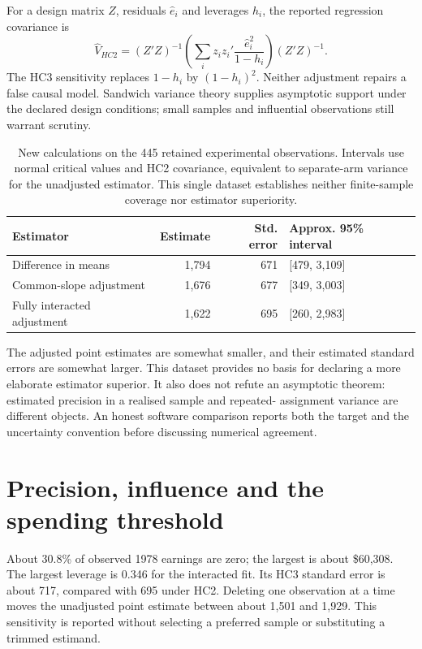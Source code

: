 For a design matrix $Z$, residuals $\widehat e_i$ and leverages $h_i$, the
reported regression covariance is
\[
 \widehat V_{HC2}=(Z'Z)^{-1}
 \left(\sum_i z_i z_i'\frac{\widehat e_i^2}{1-h_i}\right)(Z'Z)^{-1}.
\]
The HC3 sensitivity replaces $1-h_i$ by $(1-h_i)^2$. Neither adjustment
repairs a false causal model. Sandwich variance theory supplies asymptotic
support under the declared design conditions; small samples and influential
observations still warrant scrutiny. \citep{gap29lin}




\begin{table}[htbp]
\centering\small
\begin{tabular}{lrrl}
\toprule
Estimator & Estimate & Std. error & Approx. 95\% interval \\
\midrule
Difference in means & 1,794 & 671 & [479, 3,109] \\
Common-slope adjustment & 1,676 & 677 & [349, 3,003] \\
Fully interacted adjustment & 1,622 & 695 & [260, 2,983] \\
\bottomrule
\end{tabular}
\caption{New calculations on the 445 retained experimental observations.
Intervals use normal critical values and HC2 covariance, equivalent to
separate-arm variance for the unadjusted estimator. This single dataset
establishes neither finite-sample coverage nor estimator superiority.}
\end{table}




The adjusted point estimates are somewhat smaller, and their estimated
standard errors are somewhat larger. This dataset provides no basis for
declaring a more elaborate estimator superior. It also does not refute an
asymptotic theorem: estimated precision in a realised sample and repeated-
assignment variance are different objects. An honest software comparison
reports both the target and the uncertainty convention before discussing
numerical agreement.

\section{Precision, influence and the spending threshold}
About 30.8\% of observed 1978 earnings are zero; the largest is about
\$60,308. The largest leverage is 0.346 for the interacted fit. Its HC3
standard error is about 717, compared with 695 under HC2. Deleting one
observation at a time moves the unadjusted point estimate between about
1,501 and 1,929. This sensitivity is reported without selecting a preferred
sample or substituting a trimmed estimand.

